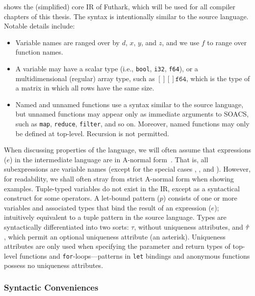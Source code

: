  shows the (simplified) core IR of Futhark, which
will be used for all compiler chapters of this thesis.  The syntax is
intentionally similar to the source language.  Notable details
include:
\begin{itemize}
\item Variable names are ranged over by $d$, $x$, $y$, and $z$, and we use
  $f$ to range over function names.
\item A variable may have a scalar type (i.e., \texttt{bool},
  \texttt{i32}, \texttt{f64}), or a multidimensional (regular) array
  type, such as $[][]\texttt{f64}$, which is the type of a matrix in
  which all rows have the same size.
\item Named and unnamed functions use a syntax similar to the source
  language, but unnamed functions may appear only as immediate
  arguments to SOACS, such as \lstinline{map}, \lstinline{reduce},
  \lstinline{filter}, and so on. Moreover, named functions may only be
  defined at top-level.  Recursion is not permitted.
\end{itemize}
When discussing properties of the language, we will often assume that
expressions ($e$) in the intermediate language are in A-normal
form~\cite{Sabry:1992:RPC:141478.141563}.  That is, all subexpressions
are variable names (except for the special cases , ,
and ).  However, for readability, we shall often stray from
strict A-normal form when showing examples.  Tuple-typed variables do
not exist in the IR, except as a syntactical construct for some
operators.  A let-bound pattern ($p$) consists of one or more
variables and associated types that bind the result of an expression
($e$); intuitively equivalent to a tuple pattern in the source
language.  Types are syntactically differentiated into two sorts:
$\tau$, without uniqueness attributes, and $\hat{\tau}$, which permit an
optional uniqueness attribute (an asterisk).  Uniqueness attributes
are only used when specifying the parameter and return types of
top-level functions and \lstinline{for}-loops---patterns in
\lstinline{let} bindings and anonymous functions possess no uniqueness
attributes.

\subsubsection{Syntactic Conveniences}

